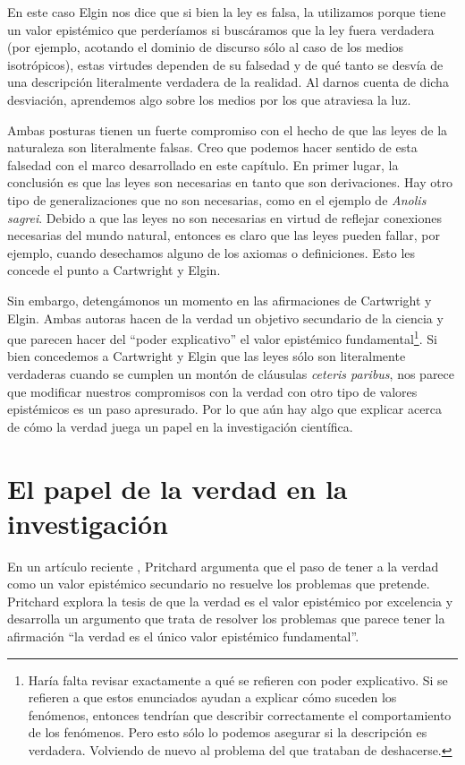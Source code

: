 En este caso Elgin nos dice que si bien la ley es falsa, la utilizamos porque tiene un valor epistémico que perderíamos si buscáramos que la ley fuera verdadera (por ejemplo, acotando el dominio de discurso sólo al caso de los medios isotrópicos), estas virtudes dependen de su falsedad y de qué tanto se desvía de una descripción literalmente verdadera de la realidad. Al darnos cuenta de dicha desviación, aprendemos algo sobre los medios por los que atraviesa la luz.

Ambas posturas tienen un fuerte compromiso con el hecho de que las leyes de la naturaleza son literalmente falsas. Creo que podemos hacer sentido de esta falsedad con el marco desarrollado en este capítulo. En primer lugar, la conclusión es que las leyes son necesarias en tanto que son derivaciones. Hay otro tipo de generalizaciones que no son necesarias, como en el ejemplo de \emph{Anolis sagrei}. Debido a que las leyes no son necesarias en virtud de reflejar conexiones necesarias del mundo natural, entonces es claro que las leyes pueden fallar, por ejemplo, cuando desechamos alguno de los axiomas o definiciones. Esto les concede el punto a Cartwright y Elgin.

Sin embargo, detengámonos un momento en las afirmaciones de Cartwright y Elgin. Ambas autoras hacen de la verdad un objetivo secundario de la ciencia y que parecen hacer del ``poder explicativo'' el valor epistémico fundamental\footnote{Haría falta revisar exactamente a qué se refieren con poder explicativo. Si se refieren a que estos enunciados ayudan a explicar cómo suceden los fenómenos, entonces tendrían que describir correctamente el comportamiento de los fenómenos. Pero esto sólo lo podemos asegurar si la descripción es verdadera. Volviendo de nuevo al problema del que trataban de deshacerse.}. Si bien concedemos a Cartwright y Elgin que las leyes sólo son literalmente verdaderas cuando se cumplen un montón de cláusulas \emph{ceteris paribus}, nos parece que modificar nuestros compromisos con la verdad con otro tipo de valores epistémicos es un paso apresurado. Por lo que aún hay algo que explicar acerca de cómo la verdad juega un papel en la investigación científica.

\section{El papel de la verdad en la investigación}

\noindent En un artículo reciente \cite{Pritchard2019}, Pritchard argumenta que el paso de tener a la verdad como un valor epistémico secundario no resuelve los problemas que pretende. Pritchard explora la tesis de que la verdad es el valor epistémico por excelencia y desarrolla un argumento que trata de resolver los problemas que parece tener la afirmación ``la verdad es el único valor epistémico fundamental''.

